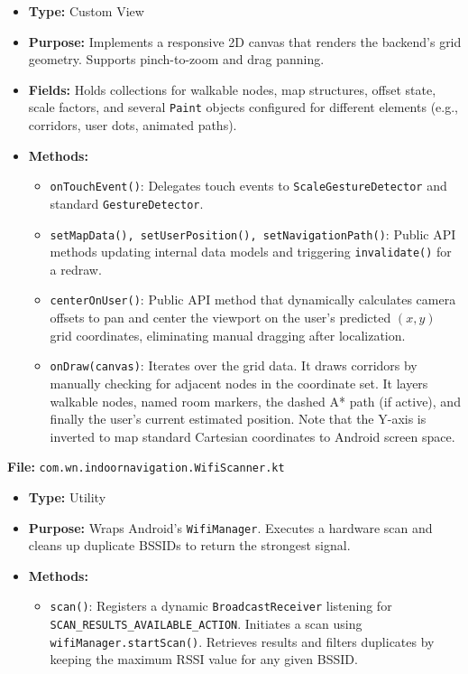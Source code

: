 \documentclass[11pt,a4paper]{article}
\begin{document}
\begin{itemize}
\item \textbf{Type:} Custom View
\item \textbf{Purpose:} Implements a responsive 2D canvas that renders the backend's grid geometry. Supports pinch-to-zoom and drag panning.
\item \textbf{Fields:} Holds collections for walkable nodes, map structures, offset state, scale factors, and several \texttt{Paint} objects configured for different elements (e.g., corridors, user dots, animated paths).
\item \textbf{Methods:}
\begin{itemize}
\item \texttt{onTouchEvent()}: Delegates touch events to \texttt{ScaleGestureDetector} and standard \texttt{GestureDetector}.
\item \texttt{setMapData(), setUserPosition(), setNavigationPath()}: Public API methods updating internal data models and triggering \texttt{invalidate()} for a redraw.
\item \texttt{centerOnUser()}: Public API method that dynamically calculates camera offsets to pan and center the viewport on the user's predicted $(x,y)$ grid coordinates, eliminating manual dragging after localization.
\item \texttt{onDraw(canvas)}: Iterates over the grid data. It draws corridors by manually checking for adjacent nodes in the coordinate set. It layers walkable nodes, named room markers, the dashed A* path (if active), and finally the user's current estimated position. Note that the Y-axis is inverted to map standard Cartesian coordinates to Android screen space.
\end{itemize}
\end{itemize}
\textbf{File:} \texttt{com.wn.indoornavigation.WifiScanner.kt}
\begin{itemize}
\item \textbf{Type:} Utility
\item \textbf{Purpose:} Wraps Android's \texttt{WifiManager}. Executes a hardware scan and cleans up duplicate BSSIDs to return the strongest signal.
\item \textbf{Methods:}
\begin{itemize}
\item \texttt{scan()}: Registers a dynamic \texttt{BroadcastReceiver} listening for \\ \texttt{SCAN\_RESULTS\_AVAILABLE\_ACTION}. Initiates a scan using \texttt{wifiManager.startScan()}. Retrieves results and filters duplicates by keeping the maximum RSSI value for any given BSSID.
\end{itemize}
\end{itemize}
\end{document}
